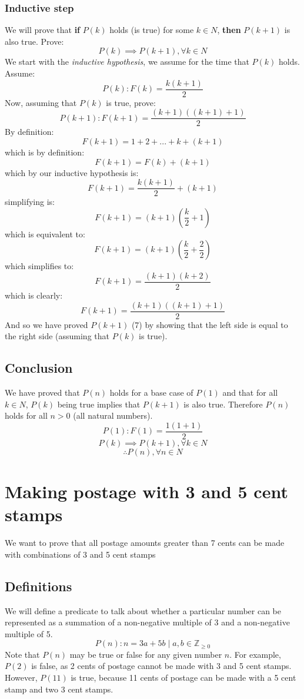 \documentclass{article}
\begin{document}
\subsubsection{Inductive step}
We will prove that \textbf{if} $P(k)$ holds (is true) for some $k \in N$, \textbf{then} $P(k + 1)$ is also true. Prove:
\begin{equation}
P(k) \implies P(k + 1), \forall k \in N
\end{equation}
We start with the \textit{inductive hypothesis}, we assume for the time that $P(k)$ holds. Assume:
\begin{equation}
P(k): F(k) = \frac{k(k + 1)}{2}
\end{equation}
Now, assuming that $P(k)$ is true, prove:
\begin{equation}
P(k + 1): F(k + 1) = \frac{(k + 1)((k + 1) + 1)}{2}
\end{equation}
By definition:
\[ F(k + 1) = 1 + 2 + ... + k + (k + 1) \]
which is by definition:
\[ F(k + 1) = F(k) + (k + 1) \]
which by our inductive hypothesis is:
\[ F(k + 1) = \frac{k(k + 1)}{2} + (k + 1) \]
simplifying is:
\[ F(k + 1) = (k + 1) (\frac{k}{2} + 1) \]
which is equivalent to:
\[ F(k + 1) = (k + 1) (\frac{k}{2} + \frac{2}{2}) \]
which simplifies to:
\[ F(k + 1) = \frac{(k + 1) (k + 2)}{2} \]
which is clearly:
\[ F(k + 1) = \frac{(k + 1) ((k + 1) + 1)}{2} \]
And so we have proved $P(k + 1)$ (7) by showing that the left side is equal to the right side (assuming that $P(k)$ is true).
\subsection{Conclusion}
We have proved that $P(n)$ holds for a base case of $P(1)$ and that for all $k \in N$, $P(k)$ being true implies that $P(k + 1)$ is also true. Therefore $P(n)$ holds for all $n > 0$ (all natural numbers).
\[P(1): F(1) = \frac{1(1 + 1)}{2}\]
\[P(k) \implies P(k + 1), \forall k \in N \]
\[ \therefore P(n), \forall n \in N \]


\section{Making postage with 3 and 5 cent stamps}
We want to prove that all postage amounts greater than 7 cents can be made with combinations of 3 and 5 cent stamps

\subsection{Definitions}
We will define a predicate to talk about whether a particular number can be represented as a summation of a non-negative multiple of 3 and a non-negative multiple of 5.
\begin{equation}
P(n): n = 3a + 5b \mid a,b \in \mathbb Z_{\ge 0}
\end{equation}
Note that $P(n)$ may be true or false for any given number $n$. For example, $P(2)$ is false, as 2 cents of postage cannot be made with 3 and 5 cent stamps. However, $P(11)$ is true, because 11 cents of postage can be made with a 5 cent stamp and two 3 cent stamps.
\end{document}
